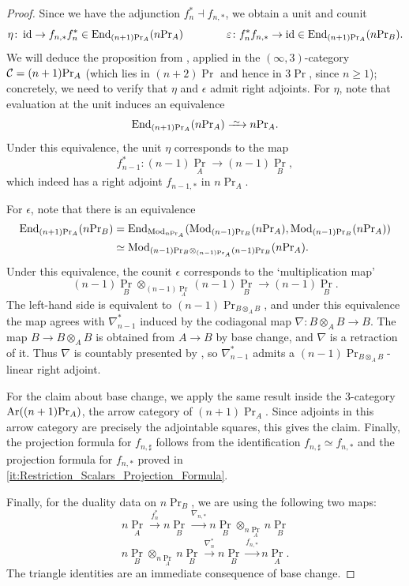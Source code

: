 \documentclass[11pt]{book}
\begin{document}
	\begin{proof}
		Since we have the adjunction $f_n^* \dashv f_{n,*}$, we obtain a unit and counit
		\[
			\eta\colon \operatorname{id} \to f_{n,*} f_n^* \in \operatorname{End}_{(n+1)\textup{Pr}_A}(n\textup{Pr}_A) \qquad \qquad \varepsilon \colon f_n^*f_{n,*} \to \operatorname{id} \in \operatorname{End}_{(n+1)\textup{Pr}_A}(n\textup{Pr}_B).
		\]
		We will deduce the proposition from , applied in the $(\infty,3)$-category $\mathcal{C} = (n+1)\textup{Pr}_A$ (which lies in $(n+2)\Pr$ and hence in $3\Pr$, since $n \geq 1$); concretely, we need to verify that $\eta$ and $\epsilon$ admit right adjoints. For $\eta$, note that evaluation at the unit induces an equivalence 
		\[
			\End_{(n+1)\Pr_A}(n\Pr_A) \iso n\Pr_A.
		\]
		Under this equivalence, the unit $\eta$ corresponds to the map
		\[
			f_{n-1}^*\colon (n-1)\Pr_A \to (n-1)\Pr_B,
		\]
		which indeed has a right adjoint $f_{n-1,*}$ in $n\Pr_A$.
		
		For $\epsilon$, note that there is an equivalence
		\begin{align*}
			\operatorname{End}_{(n+1)\textup{Pr}_A}(n\textup{Pr}_B) &= \operatorname{End}_{{\textup{Mod}}_{n\textup{Pr}_A}}({\textup{Mod}}_{(n-1)\textup{Pr}_B}(n\textup{Pr}_A), {\textup{Mod}}_{(n-1)\textup{Pr}_B}(n\textup{Pr}_A)) \\
			&\simeq {\textup{Mod}}_{(n-1)\textup{Pr}_B \otimes_{(n-1)\textup{Pr}_A} (n-1)\textup{Pr}_B}(n\textup{Pr}_A).
		\end{align*}
		Under this equivalence, the counit $\epsilon$ corresponds to the `multiplication map'
		\[
			(n-1)\Pr_B \otimes_{(n-1)\Pr_A} (n-1)\Pr_B \to (n-1)\Pr_B.
		\]
		The left-hand side is equivalent to $(n-1)\Pr_{B \otimes_A B}$, and under this equivalence the map agrees with $\nabla^*_{n-1}$ induced by the codiagonal map $\nabla\colon B \otimes_A B \to B$. The map $B \to B \otimes_A B$ is obtained from $A \to B$ by base change, and $\nabla$ is a retraction of it. Thus $\nabla$ is countably presented by , so $\nabla^*_{n-1}$ admits a $(n-1)\Pr_{B \otimes_A B}$-linear right adjoint.

		For the claim about base change, we apply the same result inside the 3-category $\operatorname{Ar}((n+1)\textup{Pr}_A)$, the arrow category of $(n+1)\Pr_A$. Since adjoints in this arrow category are precisely the adjointable squares, this gives the claim. Finally, the projection formula for $f_{n,\sharp}$ follows from the identification $f_{n,\sharp} \simeq f_{n,*}$ and the projection formula for $f_{n,*}$ proved in \eqref{it:Restriction_Scalars_Projection_Formula}.

		Finally, for the duality data on $n\Pr_B$, we are using the following two maps:
		\[
			n\Pr_A \xrightarrow{f_n^*} n\Pr_B \xrightarrow{\nabla_{n,*}} n\Pr_B \otimes_{n \Pr_A} n\Pr_B
		\]
		\[
			n\Pr_B \otimes_{n\Pr_A} n\Pr_B \xrightarrow{\nabla_n^*} n\Pr_B \xrightarrow{f_{n,*}} n\Pr_A.
		\]
		The triangle identities are an immediate consequence of base change.
	\end{proof}
\end{document}
